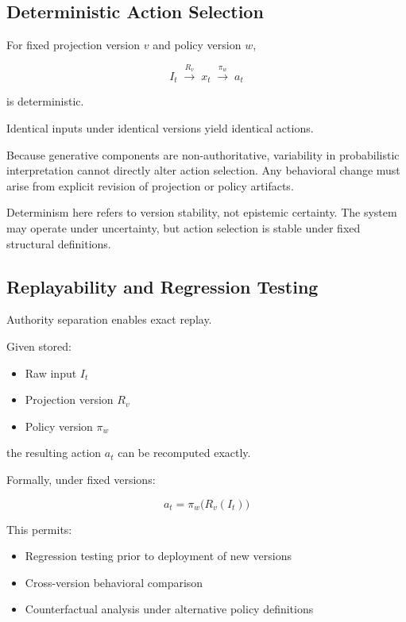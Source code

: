 \documentclass[11pt]{article}
\begin{document}
\subsection{Deterministic Action Selection}

For fixed projection version $v$ and policy version $w$,

\[
I_t 
\;\xrightarrow{R_v}\;
x_t
\;\xrightarrow{\pi_w}\;
a_t
\]

is deterministic.

Identical inputs under identical versions yield identical actions.

Because generative components are non-authoritative, variability in probabilistic interpretation cannot directly alter action selection. Any behavioral change must arise from explicit revision of projection or policy artifacts.

Determinism here refers to version stability, not epistemic certainty. The system may operate under uncertainty, but action selection is stable under fixed structural definitions.

\subsection{Replayability and Regression Testing}

Authority separation enables exact replay.

Given stored:

\begin{itemize}
  \item Raw input $I_t$
  \item Projection version $R_v$
  \item Policy version $\pi_w$
\end{itemize}

the resulting action $a_t$ can be recomputed exactly.

Formally, under fixed versions:

\[
a_t = \pi_w\big(R_v(I_t)\big)
\]

This permits:

\begin{itemize}
  \item Regression testing prior to deployment of new versions
  \item Cross-version behavioral comparison
  \item Counterfactual analysis under alternative policy definitions
\end{itemize}
\end{document}
